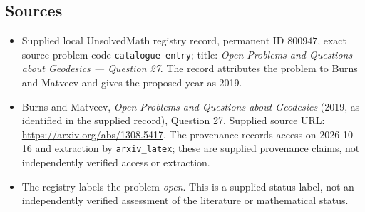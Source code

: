 \documentclass[11pt]{article}
\begin{document}
\subsection{Sources}
\begin{itemize}
\item Supplied local UnsolvedMath registry record, permanent ID \(800947\), exact source problem code \texttt{catalogue entry}; title: \emph{Open Problems and Questions about Geodesics --- Question 27}. The record attributes the problem to Burns and Matveev and gives the proposed year as 2019.
\item Burns and Matveev, \emph{Open Problems and Questions about Geodesics} (2019, as identified in the supplied record), Question 27. Supplied source URL: \url{https://arxiv.org/abs/1308.5417}. The provenance records access on 2026-10-16 and extraction by \texttt{arxiv\_latex}; these are supplied provenance claims, not independently verified access or extraction.
\item The registry labels the problem \emph{open}. This is a supplied status label, not an independently verified assessment of the literature or mathematical status.
\end{itemize}
\end{document}
